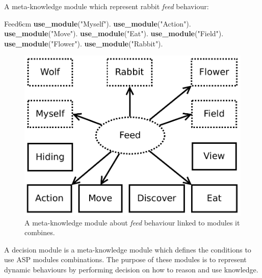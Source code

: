\documentclass{aamas2012}
\begin{document}
	\begin{example}
		\label{feed_example}
		A meta-knowledge module which represent rabbit \emph{feed} behaviour:\newline
		\begin{module}{Feed}{6cm}
			\textbf{use\_module}("Myself").\newline
			\textbf{use\_module}("Action").\newline
			\textbf{use\_module}("Move").\newline
			\textbf{use\_module}("Eat").\newline
			\textbf{use\_module}("Field").\newline
			\textbf{use\_module}("Flower").\newline
			\textbf{use\_module}("Rabbit").
		\end{module}
	\end{example}
	
	\begin{figure}
		\centering
		\includegraphics[keepaspectratio=true, scale=0.4]{feed.pdf}
		\caption
		{
			\label{feed_figure}
			A meta-knowledge module about \emph{feed} behaviour linked to modules it combines.
		}
	\end{figure}
	
	\begin{definition}
		A decision module is a meta-knowledge module which defines the conditions to use ASP modules combinations.	
		The purpose of these modules is to represent dynamic behaviours by performing decision on how to reason and use knowledge.
	\end{definition}
	
\end{document}
